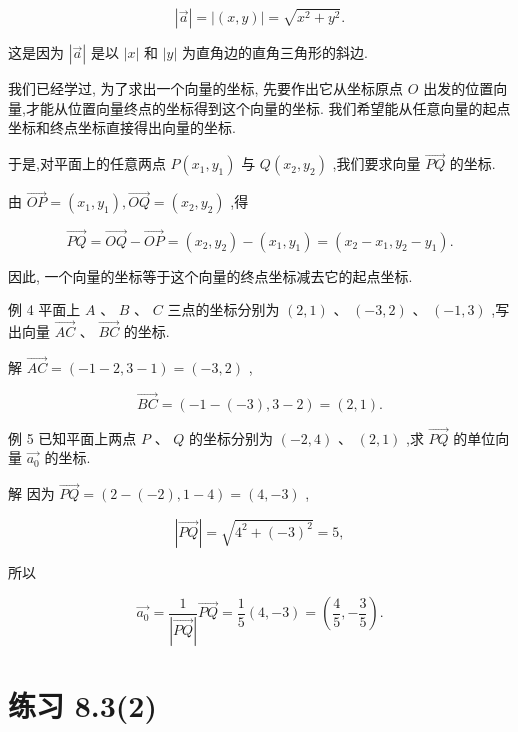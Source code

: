 \documentclass[10pt]{article}
\begin{document}
\[
\left| \overrightarrow{a}\right|  = \left| \left( {x,y}\right) \right|  = \sqrt{{x}^{2} + {y}^{2}}.
\]

这是因为 \(\left| \overrightarrow{a}\right|\) 是以 \(\left| x\right|\) 和 \(\left| y\right|\) 为直角边的直角三角形的斜边.

我们已经学过, 为了求出一个向量的坐标, 先要作出它从坐标原点 \(O\) 出发的位置向量,才能从位置向量终点的坐标得到这个向量的坐标. 我们希望能从任意向量的起点坐标和终点坐标直接得出向量的坐标.

于是,对平面上的任意两点 \(P\left( {{x}_{1},{y}_{1}}\right)\) 与 \(Q\left( {{x}_{2},{y}_{2}}\right)\) ,我们要求向量 \(\overrightarrow{PQ}\) 的坐标.

由 \(\overrightarrow{OP} = \left( {{x}_{1},{y}_{1}}\right) ,\overrightarrow{OQ} = \left( {{x}_{2},{y}_{2}}\right)\) ,得

\[
\overrightarrow{PQ} = \overrightarrow{OQ} - \overrightarrow{OP} = \left( {{x}_{2},{y}_{2}}\right)  - \left( {{x}_{1},{y}_{1}}\right)  = \left( {{x}_{2} - {x}_{1},{y}_{2} - {y}_{1}}\right) .
\]

因此, 一个向量的坐标等于这个向量的终点坐标减去它的起点坐标.

例 4 平面上 \(A\text{ 、 }B\text{ 、 }C\) 三点的坐标分别为 \(\left( {2,1}\right) \text{ 、 }\left( {-3,2}\right)\) 、 \(\left( {-1,3}\right)\) ,写出向量 \(\overrightarrow{AC}\text{ 、 }\overrightarrow{BC}\) 的坐标.

解 \(\overrightarrow{AC} = \left( {-1 - 2,3 - 1}\right)  = \left( {-3,2}\right)\) ,

\[
\overrightarrow{BC} = \left( {-1 - \left( {-3}\right) ,3 - 2}\right)  = \left( {2,1}\right) .
\]

例 5 已知平面上两点 \(P\text{ 、 }Q\) 的坐标分别为 \(\left( {-2,4}\right)\) 、 \(\left( {2,1}\right)\) ,求 \(\overrightarrow{PQ}\) 的单位向量 \(\overrightarrow{{a}_{0}}\) 的坐标.

解 因为 \(\overrightarrow{PQ} = \left( {2 - \left( {-2}\right) ,1 - 4}\right)  = \left( {4, - 3}\right)\) ,

\[
\left| \overrightarrow{PQ}\right|  = \sqrt{{4}^{2} + {\left( -3\right) }^{2}} = 5,
\]

所以

\[
\overrightarrow{{a}_{0}} = \frac{1}{\left| \overrightarrow{PQ}\right| }\overrightarrow{PQ} = \frac{1}{5}\left( {4, - 3}\right)  = \left( {\frac{4}{5}, - \frac{3}{5}}\right) .
\]

\section*{练习 8.3(2)}
\end{document}
